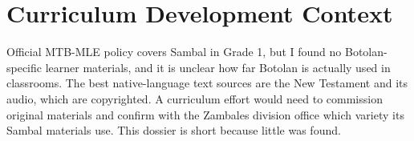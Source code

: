 \documentclass[12pt]{article}
\begin{document}
\section{Curriculum Development Context}
Official MTB-MLE policy covers Sambal in Grade 1, but I found no Botolan-specific learner materials, and it is unclear how far Botolan is actually used in classrooms. The best native-language text sources are the New Testament and its audio, which are copyrighted. A curriculum effort would need to commission original materials and confirm with the Zambales division office which variety its Sambal materials use. This dossier is short because little was found.
\end{document}
